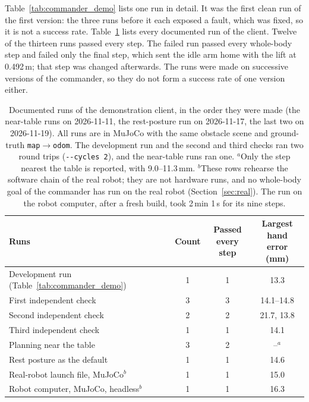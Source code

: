 \documentclass[12pt,a4paper]{article}
\begin{document}
Table~\ref{tab:commander_demo} lists one run in detail. It was the first clean run of the first
version: the three runs before it each exposed a fault, which was fixed, so it is not a success rate.
Table~\ref{tab:commander_runs} lists every documented run of the client. Twelve of the thirteen runs
passed every step. The failed run passed every whole-body step and failed only the final step, which
sent the idle arm home with the lift at 0.492\,m; that step was changed afterwards. The runs were made
on successive versions of the commander, so they do not form a success rate of one version either.

\begin{table}[H]
    \centering
    \small
    \begin{tabular}{lccc}
        \toprule
        Runs & Count & \shortstack{Passed\\every step} & \shortstack{Largest hand\\error (mm)} \\
        \midrule
        Development run (Table~\ref{tab:commander_demo}) & 1 & 1 & 13.3 \\
        First independent check                          & 3 & 3 & 14.1--14.8 \\
        Second independent check                         & 2 & 2 & 21.7, 13.8 \\
        Third independent check                          & 1 & 1 & 14.1 \\
        Planning near the table                          & 3 & 2 & --$^{a}$ \\
        Rest posture as the default                      & 1 & 1 & 14.6 \\
        Real-robot launch file, MuJoCo$^{b}$             & 1 & 1 & 15.0 \\
        Robot computer, MuJoCo, headless$^{b}$           & 1 & 1 & 16.3 \\
        \bottomrule
    \end{tabular}
    \caption{\small{Documented runs of the demonstration client, in the order they were made (the near-table
    runs on 2026-11-11, the rest-posture run on 2026-11-17, the last two on 2026-11-19). All runs are in
    MuJoCo with the same obstacle scene and ground-truth \texttt{map}$\to$\texttt{odom}. The development
    run and the second and third checks ran two round trips (\texttt{-{}-cycles 2}), and the near-table
    runs ran one. $^{a}$Only the step nearest the table is reported, with 9.0--11.3\,mm. $^{b}$These rows
    rehearse the software chain of the real robot; they are not hardware runs, and no whole-body goal of
    the commander has run on the real robot (Section~\ref{sec:real}). The run on the robot computer, after
    a fresh build, took 2\,min 1\,s for its nine steps.}}
    \label{tab:commander_runs}
\end{table}
\end{document}
